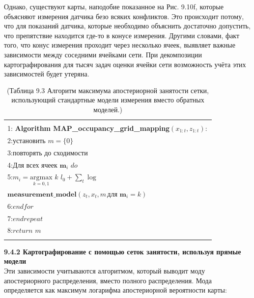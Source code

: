 \documentclass[10pt,a4paper]{article}
\begin{document}
Однако, существуют карты, наподобие показанное на Рис. 9.10f, которые объясняют измерения датчика безо всяких конфликтов. Это происходит потому, что для показаний датчика, которые необходимо объяснить достаточно допустить, что препятствие находится где-то в конусе измерения. Другими словами, факт того, что конус измерения проходит через несколько ячеек, выявляет важные зависимости между соседними ячейками сети. При декомпозиции картографирования для тысяч задач оценки ячейки сети возможность учёта этих зависимостей будет утеряна. 

\begin{table}[H]
\begin{center}
\begin{tabular}{|l|}
\hline
{}\\
1: \textbf{Algorithm MAP\_occupancy\_grid\_mapping}$(x_{1:t},z_{1:t}):$ \\
2:\hspace{5mm}$\textit{установить}\,\,m=\{0\}$\\
3:\hspace{5mm}$\textit{повторять до сходимости}$\\
4:\hspace{10mm}$\textit{Для всех ячеек}\,\,\textbf{m}_i\,\,\textit{do}$\\
5:\hspace{15mm}$m_i=\underset{k=0,1}{\text{argmax}}\,\,k\,\,l_0+\sum_t \log$\\
\hspace{25mm}$\textbf{measurement\_model} (z_t,x_t,m\,\textit{для}\,\,\textbf{m}_i=k)$\\
6:\hspace{10mm}$\textit{endfor}$\\
7:\hspace{5mm}$\textit{endrepeat}$\\
8:\hspace{5mm}$\textit{return}\,\,m$\\
{}\\
\hline
\end{tabular}
\caption{(Таблица 9.3 Алгоритм максимума апостериорной занятости сетки, использующий стандартные модели измерения вместо обратных моделей.)}
\end{center}
\end{table}

\textbf{9.4.2	Картографирование с помощью сеток занятости, используя прямые модели}\\

Эти зависимости учитываются алгоритмом, который выводит моду апостериорного распределения, вместо полного распределения. Мода определяется как максимум логарифма апостериорной вероятности карты:\\
\end{document}

